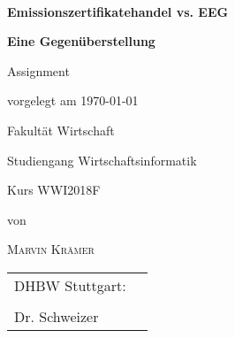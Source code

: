 \newcommand{\typMeinerArbeit}{Assignment}

\newcommand{\themaMeinerArbeit}{Emissionszertifikatehandel vs. EEG}

\newcommand{\unterThemaMeinerArbeit}{Eine Gegenüberstellung}

\newcommand{\meinName}{Marvin Krämer}

\thispagestyle{empty}

\begin{spacing}{1}
\begin{center}	
~\vspace{0mm}

{\sffamily
    \LARGE  
    \textbf{\themaMeinerArbeit}
    
    \bigskip
    \textbf{\unterThemaMeinerArbeit}
}

\vspace{15mm}

{\Large \typMeinerArbeit}

\vspace{1cm}

vorgelegt am \today 

\vspace{15mm}

Fakultät Wirtschaft
\medskip

Studiengang Wirtschaftsinformatik
\medskip

Kurs WWI2018F 

\vspace{10mm}

von

\vspace{10mm}

{\large\textsc{\meinName}}

\vspace{10mm}
\end{center}

\vfill

\begin{tabular}{ll}
DHBW Stuttgart: \\
\hspace{0.4\linewidth} & \\
Dr. Schweizer \\
\end{tabular}


\vspace{1cm}
\end{spacing}

